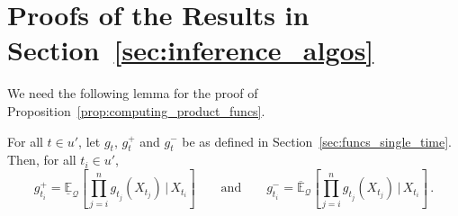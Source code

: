 \documentclass[twoside,11pt]{article}
\newcommand{\rateset}{\mathcal{Q}}
\begin{document}
\section{Proofs of the Results in Section~\ref{sec:inference_algos}}

We need the following lemma for the proof of Proposition~\ref{prop:computing_product_funcs}.
\begin{lemma}\label{lemma:product_func_induction}
For all $t\in u'$, let $g_{t}$, $g_{t}^+$ and $g_{t}^-$ be as defined in Section~\ref{sec:funcs_single_time}. Then, for all $t_i\in u'$,
\begin{equation*}
g_{t_i}^+ = \underline{\mathbb{E}}_{\rateset}\left[\prod_{j=i}^{n}g_{t_j}(X_{t_j})\,\Bigg\vert\,X_{t_i}\right] \quad\quad\text{and} \quad\quad g_{t_i}^- = \overline{\mathbb{E}}_{\rateset}\left[\prod_{j=i}^{n}g_{t_j}(X_{t_j})\,\Bigg\vert\,X_{t_i}\right]\,.
\end{equation*}
\end{lemma}
\end{document}
